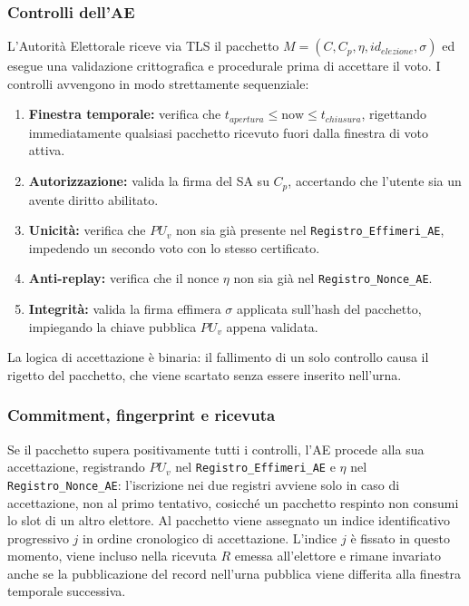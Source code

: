 \subsubsection{Controlli dell'AE}
\label{subsubsec:wp2_controlli_ae}

L'Autorità Elettorale riceve via TLS il pacchetto $M = (C, C_p, \eta, id_{elezione}, \sigma)$ ed esegue una validazione crittografica e procedurale prima di accettare il voto. I controlli avvengono in modo strettamente sequenziale:
\begin{enumerate}
    \item \textbf{Finestra temporale:} verifica che $t_{apertura} \le \text{now} \le t_{chiusura}$, rigettando immediatamente qualsiasi pacchetto ricevuto fuori dalla finestra di voto attiva.
    \item \textbf{Autorizzazione:} valida la firma del SA su $C_p$, accertando che l'utente sia un avente diritto abilitato.
    \item \textbf{Unicità:} verifica che $PU_v$ non sia già presente nel \texttt{Registro\_Effimeri\_AE}, impedendo un secondo voto con lo stesso certificato.
    \item \textbf{Anti-replay:} verifica che il nonce $\eta$ non sia già nel \texttt{Registro\_Nonce\_AE}.
    \item \textbf{Integrità:} valida la firma effimera  $\sigma$ applicata sull'hash del pacchetto, impiegando la chiave pubblica $PU_v$ appena validata.
\end{enumerate}
La logica di accettazione è binaria: il fallimento di un solo controllo causa il rigetto del pacchetto, che viene scartato senza essere inserito nell'urna.

\subsubsection{Commitment, fingerprint e ricevuta}
\label{subsubsec:wp2_commitment_ricevuta}

Se il pacchetto supera positivamente tutti i controlli, l'AE procede alla sua accettazione, registrando $PU_v$ nel \texttt{Registro\_Effimeri\_AE} e $\eta$ nel \texttt{Registro\_Nonce\_AE}: l'iscrizione nei due registri avviene solo in caso di accettazione, non al primo tentativo, cosicché un pacchetto respinto non consumi lo slot di un altro elettore. Al pacchetto viene assegnato un indice identificativo progressivo $j$ in ordine cronologico di accettazione. L'indice $j$ è fissato in questo momento, viene incluso nella ricevuta $R$ emessa all'elettore e rimane invariato anche se la pubblicazione del record nell'urna pubblica viene differita alla finestra temporale successiva.

